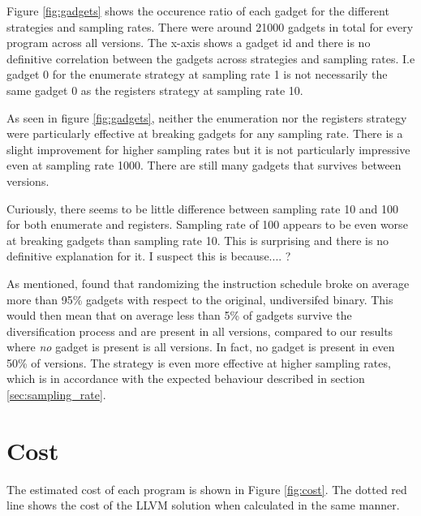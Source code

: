 Figure \ref{fig:gadgets} shows the occurence ratio of each gadget for the different
strategies and sampling rates. There were around 21000 gadgets in total for every program
across all versions. The x-axis shows a gadget id and there is no definitive correlation
between the gadgets across strategies and sampling rates. I.e gadget 0 for the enumerate
strategy at sampling rate 1 is not necessarily the same gadget 0 as the registers strategy
at sampling rate 10.

As seen in figure \ref{fig:gadgets}, neither the enumeration nor the registers strategy
were particularly effective at breaking gadgets for any sampling rate. There is a slight
improvement for higher sampling rates but it is not particularly impressive even at
sampling rate 1000. There are still many gadgets that survives between versions.

Curiously, there seems to be little difference between sampling rate 10 and 100 for both
enumerate and registers. Sampling rate of 100 appears to be even worse at breaking gadgets
than sampling rate 10. This is surprising and there is no definitive explanation for it.
I suspect this is because.... ?

As mentioned, \textcite{large-scale-automated} found that randomizing the instruction
schedule broke on average more than 95\% gadgets with respect to the original, undiversifed
binary. This would then mean that on average less than 5\% of gadgets survive the
diversification process and are present in all versions, compared to our results where
\textit{no} gadget is present is all versions. In fact, no gadget is present in even
50\% of versions. The strategy is even more effective at higher sampling rates, which is
in accordance with the expected behaviour described in section \ref{sec:sampling_rate}.


\section{Cost}

The estimated cost of each program is shown in Figure \ref{fig:cost}. The dotted red line
shows the cost of the LLVM solution when calculated in the same manner.

